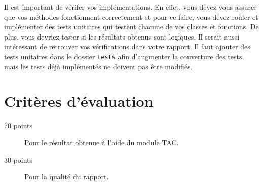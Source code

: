 \documentclass[12pt, letterpaper]{article}
\begin{document}
\noindent Il est important de vérifer vos implémentations.
En effet, vous devez vous assurer que vos méthodes fonctionnent correctement et pour ce faire, vous devez rouler et
implémenter des tests unitaires qui testent chacune de vos classes et fonctions.
De plus, vous devriez tester si les résultats obtenus sont logiques.
Il serait aussi intéressant de retrouver vos vérifications dans votre rapport.
Il faut ajouter des tests unitaires dans le dossier \texttt{tests} afin d'augmenter la couverture des tests,
mais les tests déjà implémentés ne doivent pas être modifiés.


\section{Critères d'évaluation}\label{sec:criteres-d'evaluation}

\begin{description}
  \item[70 points] Pour le résultat obtenue à l'aide du module TAC\@.
  \item[30 points] Pour la qualité du rapport.
\end{description}
\end{document}
